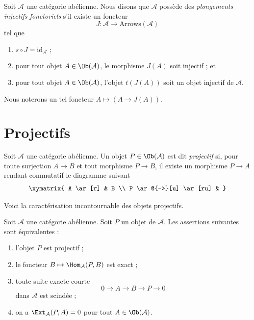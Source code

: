 \begin{definition}
\label{definition-functorial-injective-embedding}
Soit $\mathcal{A}$ une catégorie abélienne.
Nous disons que $\mathcal{A}$ possède des
{\it plongements injectifs fonctoriels}
s'il existe un foncteur
$$
J : \mathcal{A} \longrightarrow \text{Arrows}(\mathcal{A})
$$
tel que
\begin{enumerate}
\item $s \circ J = \text{id}_\mathcal{A}$ ;
\item pour tout objet $A \in \Ob(\mathcal{A})$,
le morphisme $J(A)$ soit injectif ; et
\item pour tout objet $A \in \Ob(\mathcal{A})$,
l'objet $t(J(A))$ soit un objet injectif de $\mathcal{A}$.
\end{enumerate}
Nous noterons un tel foncteur
$A \mapsto (A \to J(A))$.
\end{definition}

\section{Projectifs}
\label{section-projectives}

\begin{definition}
\label{definition-projective}
Soit $\mathcal{A}$ une catégorie abélienne.
Un objet $P \in \Ob(\mathcal{A})$ est dit
{\it projectif} si, pour toute surjection
$A \rightarrow B$ et tout morphisme
$P \to B$, il existe un morphisme $P \to A$ rendant
commutatif le diagramme suivant
$$
\xymatrix{
A \ar[r] & B \\
P \ar@{-->}[u] \ar[ru] &
}
$$
\end{definition}

\noindent
Voici la caractérisation incontournable des objets projectifs.

\begin{lemma}
\label{lemma-characterize-projectives}
Soit $\mathcal{A}$ une catégorie abélienne.
Soit $P$ un objet de $\mathcal{A}$.
Les assertions suivantes sont équivalentes :
\begin{enumerate}
\item l'objet $P$ est projectif ;
\item le foncteur $B \mapsto \Hom_\mathcal{A}(P, B)$
est exact ;
\item toute suite exacte courte
$$
0 \to A \to B \to P \to 0
$$
dans $\mathcal{A}$ est scindée ;
\item on a $\Ext_\mathcal{A}(P, A) = 0$ pour
tout $A \in \Ob(\mathcal{A})$.
\end{enumerate}
\end{lemma}


